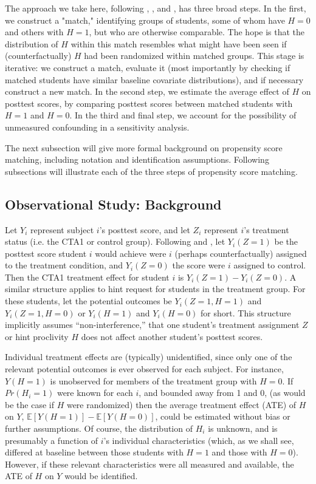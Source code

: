 \documentclass{article}\usepackage[]{graphicx}\usepackage[]{color}
\newcommand{\EE}{\mathbb{E}}
\begin{document}
The approach we take here, following \citet{rosenbaum2002observational},
 \citet{hansen2009b}, and \citet{ho:etal:2007}, has three broad steps.
In the first, we construct a "match," identifying groups of students, some of whom have $H=0$ and others with $H=1$, but who are otherwise comparable.
The hope is that the distribution of $H$ within this match resembles what might have been seen if (counterfactually) $H$ had been randomized within matched groups.
This stage is iterative: we construct a match, evaluate it (most importantly by checking if matched students have similar baseline covariate distributions), and if necessary construct a new match.
In the second step, we estimate the average effect of $H$ on posttest scores, by comparing posttest scores between matched students with $H=1$ and $H=0$.
In the third and final step, we account for the possibility of unmeasured confounding in a sensitivity analysis.

The next subsection will give more formal background on propensity score matching, including notation and identification assumptions. Following subsections will illustrate each of the three steps of propensity score matching.

\subsection{Observational Study: Background}
Let $Y_i$ represent subject $i$'s posttest score, and let $Z_i$ represent
$i$'s treatment status (i.e. the CTA1 or control group).
Following \citet{neyman} and \citet{rubin}, let $Y_i(Z=1)$ be
the posttest score student $i$ would achieve were $i$ (perhaps
counterfactually) assigned to the treatment condition, and
$Y_i(Z=0)$ the score were $i$ assigned to control.
Then the CTA1 treatment effect for student $i$ is $Y_i(Z=1)-Y_i(Z=0)$.
A similar structure applies to hint request for students in the
treatment group.
For these students, let the potential outcomes be $Y_i(Z=1,H=1)$ and
$Y_i(Z=1,H=0)$ or $Y_i(H=1)$ and $Y_i(H=0)$ for short.
This structure implicitly assumes ``non-interference,'' that one
student's treatment assignment $Z$ or hint proclivity $H$ does not
affect another student's posttest scores.

Individual treatment effects are (typically) unidentified, since only
one of the relevant potential outcomes is ever observed for each
subject.
For instance, $Y(H=1)$ is unobserved for members of the
treatment group with $H=0$.
If $Pr(H_i=1)$ were known for each $i$, and bounded away from 1 and 0, (as would be the case if $H$
were randomized) then the average treatment effect (ATE) of $H$ on $Y$,
$\EE[Y(H=1)]-\EE[Y(H=0)]$, could be estimated without bias or further
assumptions.
Of course, the distribution of $H_i$ is unknown, and is presumably a
function of $i$'s individual characteristics (which, as we shall see,
differed at baseline between those students with $H=1$ and those with $H=0$).
However, if these relevant characteristics were all measured and
available, the ATE of $H$ on $Y$ would be identified.
\end{document}
